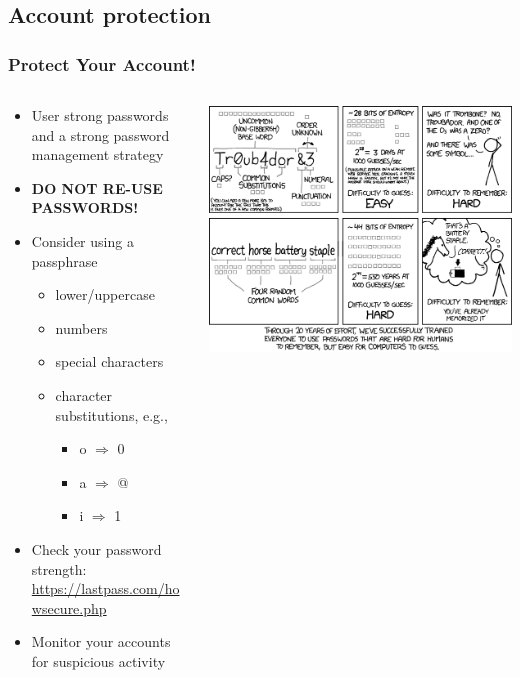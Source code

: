 \subsection{Account protection}
\begin{frame}
  \frametitle{Protect Your Account!}
\begin{columns}
\begin{column}{0.45\textwidth}
\begin{block}{}
  \begin{itemize}
  \item User strong passwords and a strong password management strategy
  \item \textbf{DO NOT RE-USE PASSWORDS!}
  \item Consider using a passphrase
    \begin{itemize}
    \item lower/uppercase
    \item numbers
    \item special characters
    \item character substitutions, e.g.,
      \begin{itemize}
      \item o $\Longrightarrow$ 0
      \item a $\Longrightarrow$ @
      \item i $\Longrightarrow$ 1
      \end{itemize}
    \end{itemize}
  \item Check your password strength: \href{https://lastpass.com/howsecure.php}{https://lastpass.com/howsecure.php}
  \item Monitor your accounts for suspicious activity
  \end{itemize}
  \end{block}
\end{column}
\begin{column}{0.49\textwidth}
\begin{block}{}
  \includegraphics[scale=0.25]{password_strength.png}

\end{block}
\end{column}
\end{columns}
\end{frame}
